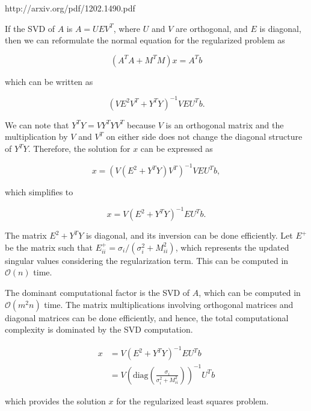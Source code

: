 \documentclass[11pt,onecolumn]{article}
\begin{document}
\begin{enumerate}[label=(\alph*)]
          http://arxiv.org/pdf/1202.1490.pdf


          If the SVD of \( A \) is \( A = UEV^T \), where \( U \) and \( V \) are orthogonal, and \( E \) is diagonal, then we can reformulate the normal equation for the regularized problem as

          \[ (A^TA + M^TM)x = A^Tb \]

          which can be written as

          \[ (V E^2 V^T + Y^T Y)^{-1} V E U^T b. \]

          We can note that \( Y^T Y = V Y^T Y V^T \) because \( V \) is an orthogonal matrix and the multiplication by \( V \) and \( V^T \) on either side does not change the diagonal structure of \( Y^T Y \). Therefore, the solution for \( x \) can be expressed as

          \[ x = \left( V(E^2 + Y^T Y)V^T \right)^{-1} VEU^Tb, \]

          which simplifies to

          \[ x = V(E^2 + Y^T Y)^{-1} E U^T b. \]

          The matrix \( E^2 + Y^T Y \) is diagonal, and its inversion can be done efficiently. Let \( E^+ \) be the matrix such that \( E^+_{ii} = \sigma_i / (\sigma_i^2 + M_{ii}^2) \), which represents the updated singular values considering the regularization term. This can be computed in \( \mathcal{O}(n) \) time.

          The dominant computational factor is the SVD of \( A \), which can be computed in \( \mathcal{O}(m^2n) \) time. The matrix multiplications involving orthogonal matrices and diagonal matrices can be done efficiently, and hence, the total computational complexity is dominated by the SVD computation.


          \begin{align*}
              x & = V(E^2 + Y^T Y)^{-1} E U^T b                                                              \\
                & = V \left(\text{diag}\left(\frac{\sigma_i}{\sigma_i^2 + M_{ii}^2}\right)\right)^{-1} U^T b
          \end{align*}

          which provides the solution \( x \) for the regularized least squares problem.




\end{enumerate}
\end{document}
